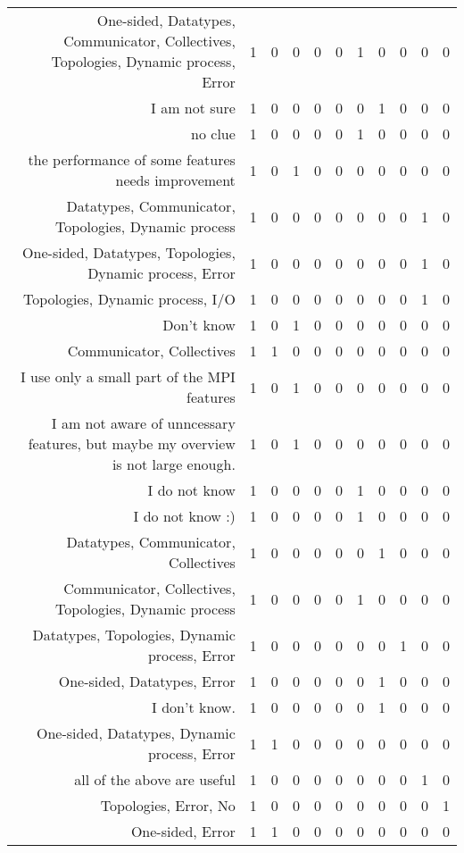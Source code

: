 {\begin{landscape}
\begin{longtable}[htb]{r|c|c|c|c|c|c|c|c|c|c}
{One-sided, Datatypes, Communicator, Collectives, Topologies, Dynamic process, Error} & 1 & 0 & 0 & 0 & 0 & 1 & 0 & 0 & 0 & 0 \\%
{I am not sure} & 1 & 0 & 0 & 0 & 0 & 0 & 1 & 0 & 0 & 0 \\%
{no clue} & 1 & 0 & 0 & 0 & 0 & 1 & 0 & 0 & 0 & 0 \\%
{the performance of some features needs improvement} & 1 & 0 & 1 & 0 & 0 & 0 & 0 & 0 & 0 & 0 \\%
{Datatypes, Communicator, Topologies, Dynamic process} & 1 & 0 & 0 & 0 & 0 & 0 & 0 & 0 & 1 & 0 \\%
{One-sided, Datatypes, Topologies, Dynamic process, Error} & 1 & 0 & 0 & 0 & 0 & 0 & 0 & 0 & 1 & 0 \\%
{Topologies, Dynamic process, I/O} & 1 & 0 & 0 & 0 & 0 & 0 & 0 & 0 & 1 & 0 \\%
{Don't know} & 1 & 0 & 1 & 0 & 0 & 0 & 0 & 0 & 0 & 0 \\%
{Communicator, Collectives} & 1 & 1 & 0 & 0 & 0 & 0 & 0 & 0 & 0 & 0 \\%
{I use only a small part of the MPI features} & 1 & 0 & 1 & 0 & 0 & 0 & 0 & 0 & 0 & 0 \\%
{I am not aware of unncessary features, but maybe my overview is not large enough.} & 1 & 0 & 1 & 0 & 0 & 0 & 0 & 0 & 0 & 0 \\%
{I do not know} & 1 & 0 & 0 & 0 & 0 & 1 & 0 & 0 & 0 & 0 \\%
{I do not know :)} & 1 & 0 & 0 & 0 & 0 & 1 & 0 & 0 & 0 & 0 \\%
{Datatypes, Communicator, Collectives} & 1 & 0 & 0 & 0 & 0 & 0 & 1 & 0 & 0 & 0 \\%
{Communicator, Collectives, Topologies, Dynamic process} & 1 & 0 & 0 & 0 & 0 & 1 & 0 & 0 & 0 & 0 \\%
{Datatypes, Topologies, Dynamic process, Error} & 1 & 0 & 0 & 0 & 0 & 0 & 0 & 1 & 0 & 0 \\%
{One-sided, Datatypes, Error} & 1 & 0 & 0 & 0 & 0 & 0 & 1 & 0 & 0 & 0 \\%
{I don't know.} & 1 & 0 & 0 & 0 & 0 & 0 & 1 & 0 & 0 & 0 \\%
{One-sided, Datatypes, Dynamic process, Error} & 1 & 1 & 0 & 0 & 0 & 0 & 0 & 0 & 0 & 0 \\%
{all of the above are useful} & 1 & 0 & 0 & 0 & 0 & 0 & 0 & 0 & 1 & 0 \\%
{Topologies, Error, No} & 1 & 0 & 0 & 0 & 0 & 0 & 0 & 0 & 0 & 1 \\%
{One-sided, Error} & 1 & 1 & 0 & 0 & 0 & 0 & 0 & 0 & 0 & 0 \\%

\end{longtable}
\end{landscape}}
